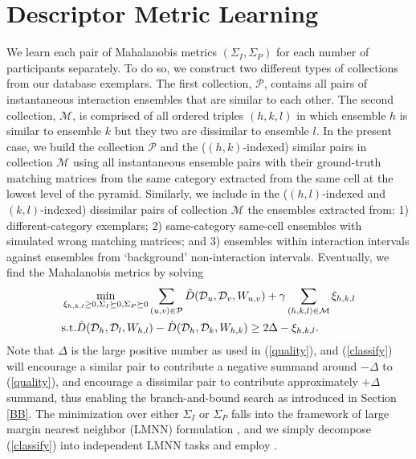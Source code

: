 \section{Descriptor Metric Learning}
\label{MetLearn}

We learn each pair of Mahalanobis metrics $(\Sigma_{I}, \Sigma_{P})$ for each number of participants separately. To do so, we construct two different types of collections from our database exemplars. The first collection, $\mathcal{P}$, contains all pairs of instantaneous interaction ensembles that are similar to each other. The second collection, $\mathcal{M}$, is comprised of all ordered triples $(h,k,l)$ in which ensemble $h$ is similar to ensemble $k$ but they two  are dissimilar to ensemble $l$. In the present case, we build the collection $\mathcal{P}$ and the ($(h,k)$-indexed) similar pairs in collection $\mathcal{M}$ using all instantaneous ensemble pairs with their ground-truth matching matrices from the same category extracted from the same cell at the lowest level of the pyramid. Similarly, we include in the ($(h,l)$-indexed and $(k,l)$-indexed) dissimilar pairs of collection $\mathcal{M}$ the ensembles extracted from: 1) different-category exemplars; 2) same-category same-cell ensembles with simulated wrong matching matrices; and 3) ensembles within interaction intervals against ensembles from `background' non-interaction intervals. Eventually, we find the Mahalanobis metrics by solving
\begin{equation}
\label{classify}
\begin{split}
&\min_{\xi_{h,k,l}\ge0, \Sigma_{I}\succeq 0, \Sigma_{P}\succeq 0} \sum_{(u,v)\in\mathcal{P}}\hat{D}(\mathcal{D}_{u}, \mathcal{D}_{v}, W_{u,v})+\gamma\sum_{(h,k,l)\in\mathcal{M}}\xi_{h,k,l}\\
&\textup{s.t.}  \hat{D}(\mathcal{D}_{h}, \mathcal{D}_{l}, W_{h,l})-\hat{D}(\mathcal{D}_{h}, \mathcal{D}_{k}, W_{h,k})\ge 2\Delta-\xi_{h,k,l}.
\end{split}
\end{equation}
Note that $\Delta$ is the large positive number as used in (\ref{quality}), and (\ref{classify}) will encourage a similar pair to contribute a negative summand around $-\Delta$ to (\ref{quality}), and encourage a dissimilar pair to contribute approximately $+\Delta$ summand,  thus enabling the branch-and-bound search as introduced in Section \ref{BB}.  The minimization over either $\Sigma_{I}$ or $\Sigma_{P}$ falls into the framework of large margin nearest neighbor (LMNN) formulation \cite{Weinberger:ML}, and we simply decompose (\ref{classify}) into independent LMNN tasks and employ \cite{Weinberger:ML}.


